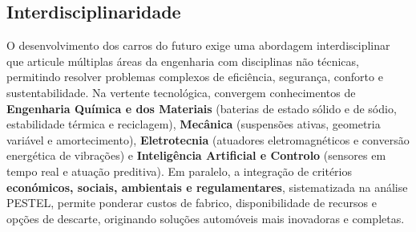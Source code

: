 \subsection{Interdisciplinaridade}
\begin{campotexto}
O desenvolvimento dos carros do futuro exige uma abordagem interdisciplinar que articule múltiplas áreas da engenharia com disciplinas não técnicas, permitindo resolver problemas complexos de eficiência, segurança, conforto e sustentabilidade. Na vertente tecnológica, convergem conhecimentos de \textbf{Engenharia Química e dos Materiais} (baterias de estado sólido e de sódio, estabilidade térmica e reciclagem), \textbf{Mecânica} (suspensões ativas, geometria variável e amortecimento), \textbf{Eletrotecnia} (atuadores eletromagnéticos e conversão energética de vibrações) e \textbf{Inteligência Artificial e Controlo} (sensores em tempo real e atuação preditiva). Em paralelo, a integração de critérios \textbf{económicos, sociais, ambientais e regulamentares}, sistematizada na análise PESTEL, permite ponderar custos de fabrico, disponibilidade de recursos e opções de descarte, originando soluções automóveis mais inovadoras e completas.
\end{campotexto}
